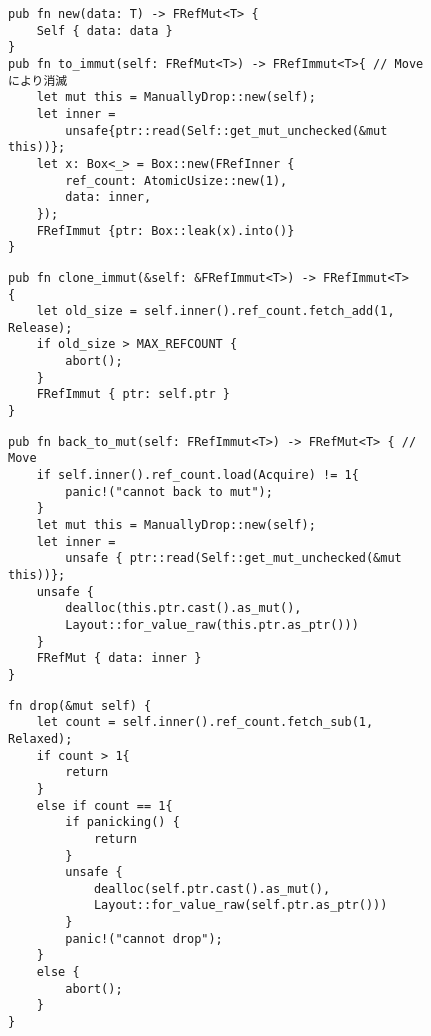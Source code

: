 \documentclass{sumiilab-paper}
\theoremstyle{mystyle}
\numberwithin{definition}{chapter} %
\begin{document}
\begin{figure}[htp]
\begin{lstlisting}[caption=関数newと関数to\_immutの実装, label=new_to_implementation, captionpos=b]
pub fn new(data: T) -> FRefMut<T> {
    Self { data: data }
}
pub fn to_immut(self: FRefMut<T>) -> FRefImmut<T>{ // Moveにより消滅
    let mut this = ManuallyDrop::new(self);
    let inner =
        unsafe{ptr::read(Self::get_mut_unchecked(&mut this))};
    let x: Box<_> = Box::new(FRefInner {
        ref_count: AtomicUsize::new(1),
        data: inner,
    });
    FRefImmut {ptr: Box::leak(x).into()}
}
\end{lstlisting}
\end{figure}

\begin{figure}[htp]
\begin{lstlisting}[caption=関数clone\_immutの実装, label=clone_implementation, captionpos=b]
pub fn clone_immut(&self: &FRefImmut<T>) -> FRefImmut<T>
{
    let old_size = self.inner().ref_count.fetch_add(1, Release);
    if old_size > MAX_REFCOUNT {
        abort();
    }
    FRefImmut { ptr: self.ptr }
}
\end{lstlisting}
\end{figure}

\begin{figure}[htp]
\begin{lstlisting}[caption=関数back\_to\_mutの実装, label=back_implementation, captionpos=b]
pub fn back_to_mut(self: FRefImmut<T>) -> FRefMut<T> { // Move
    if self.inner().ref_count.load(Acquire) != 1{
        panic!("cannot back to mut");
    }
    let mut this = ManuallyDrop::new(self);
    let inner =
        unsafe { ptr::read(Self::get_mut_unchecked(&mut this))};
    unsafe {
        dealloc(this.ptr.cast().as_mut(), 
        Layout::for_value_raw(this.ptr.as_ptr()))
    }
    FRefMut { data: inner }
}
\end{lstlisting}
\end{figure}

\begin{figure}[htp]
\begin{lstlisting}[caption=関数dropの実装, label=drop_implementation, captionpos=b]
fn drop(&mut self) {
    let count = self.inner().ref_count.fetch_sub(1, Relaxed);
    if count > 1{
        return
    }
    else if count == 1{
        if panicking() {
            return
        }
        unsafe {
            dealloc(self.ptr.cast().as_mut(), 
            Layout::for_value_raw(self.ptr.as_ptr()))
        }
        panic!("cannot drop");
    }
    else {
        abort();
    }
}
\end{lstlisting}
\end{figure}
\end{document}
